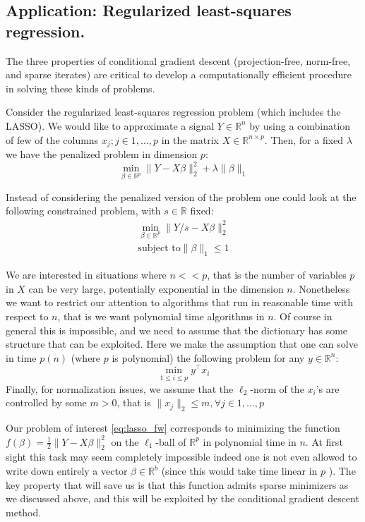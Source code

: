 \subsection{Application: Regularized least-squares regression.}
The three properties of conditional gradient descent (projection-free, norm-free, and sparse iterates) are critical to develop a computationally efficient procedure in solving these kinds of problems.

Consider the regularized least-squares regression problem (which includes the LASSO). We would like to approximate a signal $Y \in \mathbb{R}^n$ by using a combination of few of the columns $x_j; j\in 1,\ldots,p$ in the matrix $X \in \mathbb{R}^{n \times p}$. Then, for a fixed $\lambda$ we have the penalized problem in dimension $p$:
\begin{equation}
\min_{\beta \in \mathbb{R}^p} \| Y - X \beta \|_2^2 + \lambda \|\beta\|_1 \nonumber
\end{equation}

Instead of considering the penalized version of the problem one could look at the following constrained problem, with $s \in \mathbb{R}$ fixed:
\begin{align} \label{eq:lasso_fw}
\min_{\beta \in \mathbb{R}^p} \| Y/s - X \beta \|_2^2 \\
\text{subject to} \|\beta\|_1 \leq 1 \nonumber
\end{align}

We are interested in situations where $n<<p$, that is the number of variables $p$ in $X$ can be very large, potentially exponential in the dimension $n$. Nonetheless we want to restrict our attention to algorithms that run in reasonable time with respect to $n$, that is we want polynomial time algorithms in $n$. Of course in general this is impossible, and we need to assume that the dictionary has some structure that can be exploited. Here we make the assumption that one can solve in time $p(n)$ (where $p$ is polynomial) the following problem for any $y\in\mathbb{R}^n$:
\begin{equation}
\min_{ 1\leq i \leq p } y^{\top} x_i\nonumber
\end{equation}
Finally, for normalization issues, we assume that the $\ell_2$-norm of the $x_i$'s are controlled by some $m > 0$, that is $\| x_j \|_2 \leq m, \forall j \in 1,\ldots,p $

Our problem of interest \ref{eq:lasso_fw} corresponds to minimizing the function $f(\beta) = \frac{1}{2}\| Y - X \beta \|_2^2 $ on the $\ell_1$-ball of $\mathbb{R}^p$ in polynomial time in $n$. At first sight this task may seem completely impossible indeed one is not even allowed to write down entirely a vector $\beta \in \mathbb{R}^b$ (since this would take time linear in $p$ ). The key property that will save us is that this function admits sparse minimizers as we discussed above, and this will be exploited by the conditional gradient descent method.

